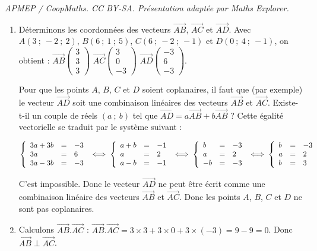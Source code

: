 \documentclass[10pt]{article}
\providecommand{\vect}[1]{\overrightarrow{#1}}
\begin{document}
\noindent\textit{APMEP / CoopMaths. CC BY-SA. Présentation adaptée par Maths Explorer.}\par\medskip
\medskip

\begin{enumerate}
\item Déterminons les coordonnées des vecteurs $\vect{AB}$, $\vect{AC}$ et $\vect{AD}$. Avec $A(3~;~-2~;~2)$, $B(6~;~1~;~5)$, $C(6~;~-2~;~-1)$ et $D(0~;~4~;~-1)$, on obtient : 
	\(\overrightarrow{AB}\begin{pmatrix}3\\3\\3\end{pmatrix}\) \quad \(\overrightarrow{AC}\begin{pmatrix}3\\0\\-3\end{pmatrix}\) \quad \(\overrightarrow{AD}\begin{pmatrix}-3\\6\\-3\end{pmatrix}\).
	
Pour que les points $A$, $B$, $C$ et $D$ soient coplanaires, il faut que (par exemple) le vecteur $\vect{AD}$ soit une combinaison linéaires des vecteurs $\vect{AB}$ et $\vect{AC}$. Existe-t-il un couple de réels $(a~;~b)$ tel que $\vect{AD}=a\vect{AB}+b\vect{AB}$ ? Cette égalité vectorielle se traduit par le système suivant :
	
$\left\{\begin{array}{l c l} 3a+3b&=&-3\\3a &=& 6\\3a-3b&=&-3	\end{array}\right. \iff \left\{\begin{array}{l c l} a+b&=&-1\\a &=& 2\\a-b&=&-1	\end{array}\right.\iff \left\{\begin{array}{l c l} b&=&-3\\a &=& 2\\-b&=&-3 \end{array}\right. \iff \left\{\begin{array}{l c l} b&=&-3\\a &=& 2\\b&=&3	\end{array}\right.$
	
C'est impossible. Donc le vecteur $\vect{AD}$ ne peut être écrit comme une combinaison linéaire des vecteurs $\vect{AB}$ et $\vect{AC}$. Donc les points $A$, $B$, $C$ et $D$ ne sont pas coplanaires.
	\item Calculons $\vect{AB}.\vect{AC}$ : $\vect{AB}.\vect{AC}=3\times3+3\times 0+ 3\times (-3) = 9 - 9 = 0$. Donc $\vect{AB}\perp \vect{AC}$.
	

\end{enumerate}
\end{document}
